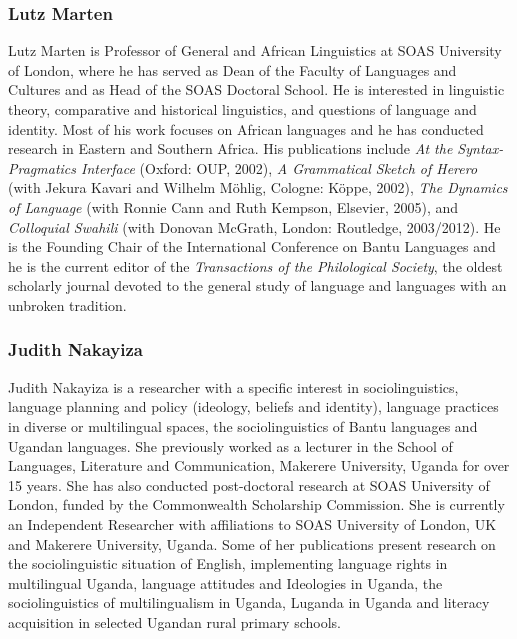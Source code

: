 \subsubsection*{Lutz Marten }
Lutz Marten is Professor of General and African Linguistics at SOAS University of London, where he has served as Dean of the Faculty of Languages and Cultures and as Head of the SOAS Doctoral School. He is interested in linguistic theory, comparative and historical linguistics, and questions of language and identity. Most of his work focuses on African languages and he has conducted research in Eastern and Southern Africa. His publications include \textit{At the Syntax-Pragmatics Interface}  (Oxford: OUP, 2002), \textit{A Grammatical Sketch of Herero} (with Jekura Kavari and Wilhelm Möhlig, {Cologne: Köppe, 2002}), \textit{The Dynamics of Language} (with Ronnie Cann and Ruth Kempson,  {Elsevier, 2005}), and \textit{Colloquial Swahili} (with Donovan McGrath,  {London: Routledge, 2003}/2012). He is the Founding Chair of the International Conference on Bantu Languages and he is the current editor of the \textit{Transactions of the Philological Society}, the oldest scholarly journal devoted to the general study of language and languages with an unbroken tradition.

\subsubsection*{Judith Nakayiza }
Judith Nakayiza is a researcher with a specific interest in sociolinguistics, language planning and policy (ideology, beliefs and identity), language practices in diverse or multilingual spaces, the sociolinguistics of Bantu languages and Ugandan languages. She previously worked as a lecturer in the School of Languages, Literature and Communication, Makerere University, Uganda for over 15 years. She has also conducted post-doctoral research at SOAS University of London, funded by the Commonwealth Scholarship Commission. She is currently an Independent Researcher with affiliations to SOAS University of London, UK and Makerere University, Uganda. Some of her publications present research on the sociolinguistic situation of English, implementing language rights in multilingual Uganda, language attitudes and Ideologies in Uganda, the sociolinguistics of multilingualism in Uganda, Luganda in Uganda and literacy acquisition in selected Ugandan rural primary schools.

